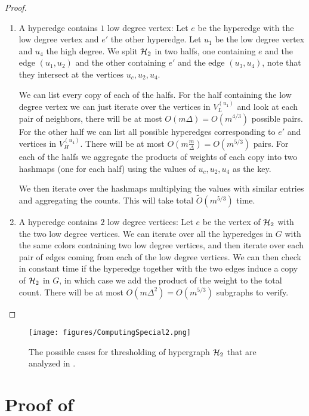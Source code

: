 \documentclass[a4paper,UKenglish,cleveref, autoref, numberwithinsect, thm-restate]{lipics-v2021}
\newcommand{\hypertwo}{\cH_2}
\newcommand{\cH}{{\cal H}}
\begin{document}
\begin{proof}
\begin{enumerate}
			\item A hyperedge contains $1$ low degree vertex: Let $e$ be the hyperedge with the low degree vertex and $e'$ the other hyperedge. Let $u_1$ be the low degree vertex and $u_4$ the high degree. We split $\hypertwo$ in two halfs, one containing $e$ and the edge $(u_1,u_2)$ and the other containing $e'$ and the edge $(u_3,u_4)$, note that they intersect at the vertices $u_c,u_2,u_4$. 
			
			We can list every copy of each of the halfs. For the half containing the low degree vertex we can just iterate over the vertices in $V^{(u_1)}_L$ and look at each pair of neighbors, there will be at most $O(m\Delta) = O(m^{4/3})$ possible pairs. For the other half we can list all possible hyperedges corresponding to $e'$ and vertices in $V^{(u_4)}_H$. There will be at most $O(m\frac{m}{\Delta}) = O(m^{5/3})$ pairs. For each of the halfs we aggregate the products of weights of each copy into two hashmaps (one for each half) using the values of $u_c,u_2,u_4$ as the key. 
			
			We then iterate over the hashmaps multiplying the values with similar entries and aggregating the counts. This will take total $\tilde{O}(m^{5/3})$ time.
			
			\item A hyperedge contains $2$ low degree vertices: Let $e$ be the vertex of $\hypertwo$ with the two low degree vertices. We can iterate over all the hyperedges in $G$ with the same colors containing two low degree vertices, and then iterate over each pair of edges coming from each of the low degree vertices. We can then check in constant time if the hyperedge together with the two edges induce a copy of $\hypertwo$ in $G$, in which case we add the product of the weight to the total count. There will be at most $O(m\Delta^2)= O(m^{5/3})$ subgraphs to verify.
		\end{enumerate}
	\end{proof}
	
	\begin{figure}
		\centering
		\texttt{[image: figures/ComputingSpecial2.png]}\caption{The possible cases for thresholding of hypergraph $\hypertwo$ that are analyzed in .}
		\label{fig:hypertwocomp}
	\end{figure}

	
	\section{Proof of }
	
\end{document}
